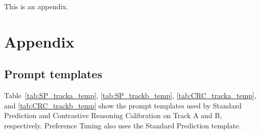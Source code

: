 \documentclass[11pt]{article}
\begin{document}
This is an appendix.

\fi

\section{Appendix}

\subsection{Prompt templates}
\label{sec:app_PT}

Table~\ref{tab:SP_tracka_temp}, \ref{tab:SP_trackb_temp}, \ref{tab:CRC_tracka_temp}, and \ref{tab:CRC_trackb_temp} show the prompt templates used by Standard Prediction and Contrastive Reasoning Calibration on Track A and B, respectively. Preference Tuning also uses the Standard Prediction template.
\end{document}
